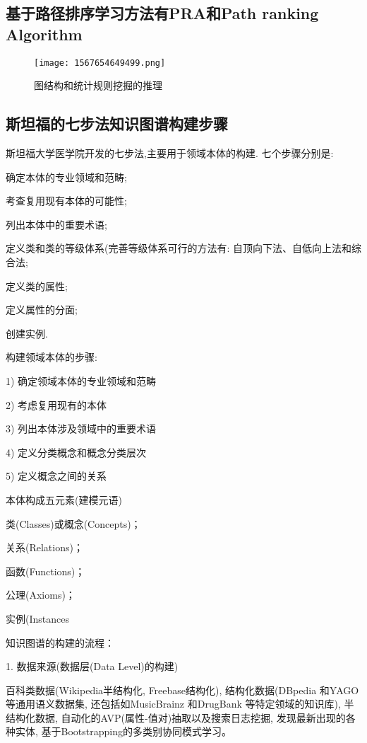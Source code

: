 \subsection{基于路径排序学习方法有PRA和Path ranking Algorithm}
\begin{figure}[H]
\centering
\texttt{[image: 1567654649499.png]}
\caption{图结构和统计规则挖掘的推理}
\label{AI321567654649499}
\end{figure}
\subsection{斯坦福的七步法知识图谱构建步骤}
斯坦福大学医学院开发的七步法,主要用于领域本体的构建. 七个步骤分别是:

 确定本体的专业领域和范畴;

 考查复用现有本体的可能性;

 列出本体中的重要术语;

 定义类和类的等级体系(完善等级体系可行的方法有: 自顶向下法、自低向上法和综合法;

  定义类的属性;

  定义属性的分面;

  创建实例.

构建领域本体的步骤:

1) 确定领域本体的专业领域和范畴

2) 考虑复用现有的本体

3) 列出本体涉及领域中的重要术语

4) 定义分类概念和概念分类层次

5) 定义概念之间的关系

本体构成五元素(建模元语)

 类(Classes)或概念(Concepts)；

  关系(Relations)；

 函数(Functions)；

 公理(Axioms)；

 实例(Instances

知识图谱的构建的流程：

1. 数据来源(数据层(Data Level)的构建)

百科类数据(Wikipedia半结构化, Freebase结构化),
结构化数据(DBpedia 和YAGO 等通用语义数据集, 还包括如MusicBrainz 和DrugBank 等特定领域的知识库),
半结构化数据, 自动化的AVP(属性-值对)抽取以及搜索日志挖掘, 发现最新出现的各种实体, 基于Bootstrapping的多类别协同模式学习。

